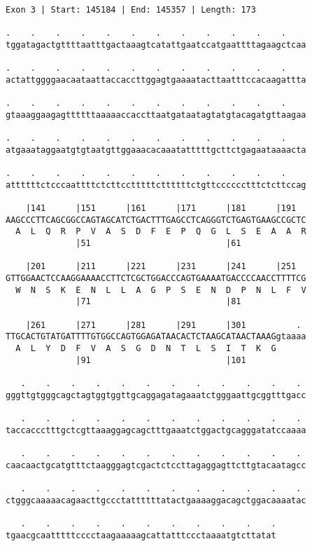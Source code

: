 \documentclass{article}
\begin{document}
\begin{Verbatim}[fontfamily=courier]
Exon 3 | Start: 145184 | End: 145357 | Length: 173

.    .    .    .    .    .    .    .    .    .    .    .    
tggatagactgttttaatttgactaaagtcatattgaatccatgaattttagaagctcaa

.    .    .    .    .    .    .    .    .    .    .    .    
actattggggaacaataattaccaccttggagtgaaaatacttaatttccacaagattta

.    .    .    .    .    .    .    .    .    .    .    .    
gtaaaggaagagttttttaaaaaccaccttaatgataatagtatgtacagatgttaagaa

.    .    .    .    .    .    .    .    .    .    .    .    
atgaaataggaatgtgtaatgttggaaacacaaatatttttgcttctgagaataaaacta

.    .    .    .    .    .    .    .    .    .    .    .    
attttttctcccaattttctcttcctttttcttttttctgttcccccctttctcttccag

    |141      |151      |161      |171      |181      |191  
AAGCCCTTCAGCGGCCAGTAGCATCTGACTTTGAGCCTCAGGGTCTGAGTGAAGCCGCTC
  A  L  Q  R  P  V  A  S  D  F  E  P  Q  G  L  S  E  A  A  R
              |51                           |61             

    |201      |211      |221      |231      |241      |251  
GTTGGAACTCCAAGGAAAACCTTCTCGCTGGACCCAGTGAAAATGACCCCAACCTTTTCG
  W  N  S  K  E  N  L  L  A  G  P  S  E  N  D  P  N  L  F  V
              |71                           |81             

    |261      |271      |281      |291      |301          . 
TTGCACTGTATGATTTTGTGGCCAGTGGAGATAACACTCTAAGCATAACTAAAGgtaaaa
  A  L  Y  D  F  V  A  S  G  D  N  T  L  S  I  T  K  G      
              |91                           |101            

   .    .    .    .    .    .    .    .    .    .    .    . 
gggttgtgggcagctagtggtggttgcaggagatagaaatctgggaattgcggtttgacc

   .    .    .    .    .    .    .    .    .    .    .    . 
taccaccctttgctcgttaaaggagcagctttgaaatctggactgcagggatatccaaaa

   .    .    .    .    .    .    .    .    .    .    .    . 
caacaactgcatgtttctaagggagtcgactctccttagaggagttcttgtacaatagcc

   .    .    .    .    .    .    .    .    .    .    .    . 
ctgggcaaaaacagaacttgccctattttttatactgaaaaggacagctggacaaaatac

   .    .    .    .    .    .    .    .    .    .    .
tgaacgcaatttttcccctaagaaaaagcattatttccctaaaatgtcttatat
\end{Verbatim}
\end{document}
